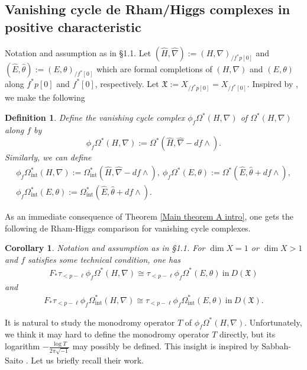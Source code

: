 \documentclass[12pt, a4paper]{article}
\newtheorem{definition}{Definition}[section]
\newtheorem{corollary}{Corollary}[section]
\begin{document}
\subsection{Vanishing cycle de Rham/Higgs complexes in positive characteristic}
Notation and assumption as in \S1.1. Let $(\hat H,\hat\nabla):=(H,\nabla)_{/f^*p[0]}$ and $(\hat E,\hat\theta):=(E,\theta)_{/f^*[0]}$ which are formal completions of $(H,\nabla)$ and $(E,\theta)$ along $f^*p[0]$ and $f^*[0]$, respectively. Let $\mathfrak X:=X_{/f^*p[0]}=X_{/f^*[0]}$. Inspired by \cite[Remark 0.4]{Sah1}, we make the following
\begin{definition}
Define the vanishing cycle complex $\phi_f\Omega^*(H,\nabla)$ of $\Omega^*(H,\nabla)$ along $f$ by
$$
\phi_f\Omega^*(H,\nabla):=\Omega^*(\hat H,\hat\nabla-df\wedge).
$$
Similarly, we can define
$$
\begin{array}{c}
\phi_f\Omega_\mathrm{int}^*(H,\nabla):=\Omega_\mathrm{int}^*(\hat H,\hat\nabla-df\wedge),~\phi_f\Omega^*(E,\theta):=\Omega^*(\hat E,\hat\theta+df\wedge),\\
\phi_f\Omega_\mathrm{int}^*(E,\theta):=\Omega_\mathrm{int}^*(\hat E,\hat\theta+df\wedge).
\end{array}
$$
\end{definition}
As an immediate consequence of Theorem \ref{Main theorem A intro}, one gets the following de Rham-Higgs comparison for vanishing cycle complexes.
\begin{corollary}
Notation and assumption as in \S1.1. For $\dim X=1$ or $\dim X>1$ and $f$ satisfies some technical condition, one has
\begin{eqnarray}\label{twisted log intro}
F_*\tau_{<p-\ell}\phi_f\Omega^*(H,\nabla)\cong\tau_{<p-\ell}\phi_f\Omega^*(E,\theta)~\mathrm{in}~D(\mathfrak X)
\end{eqnarray}
and
\begin{eqnarray}\label{twisted int intro}
F_*\tau_{<p-\ell}\phi_f\Omega_\mathrm{int}^*(H,\nabla)\cong\tau_{<p-\ell}\phi_f\Omega_\mathrm{int}^*(E,\theta)~\mathrm{in}~D(\mathfrak X).
\end{eqnarray}
\end{corollary}
It is natural to study the monodromy operator $T$ of $\phi_f\Omega^*(H,\nabla)$. Unfortunately, we think it may hard to define the monodromy operator $T$ directly, but its logarithm $-\frac{\log T}{2\pi\sqrt{-1}} $ may possibly be defined. This insight is inspired by Sabbah-Saito \cite{SS}. Let us briefly recall their work.
\end{document}
